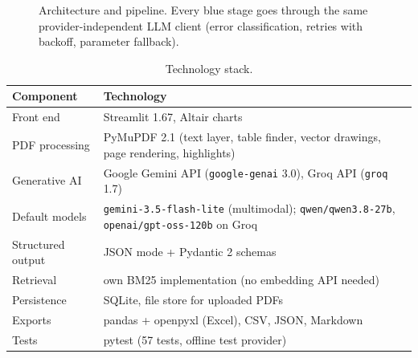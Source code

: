 \documentclass[11pt,a4paper]{article}
\newcommand{\code}[1]{\texttt{\small #1}}
\begin{document}
\begin{figure}[H]
\caption{Architecture and pipeline. Every blue stage goes through the same provider-independent LLM client
(error classification, retries with backoff, parameter fallback).}
\label{fig:arch}
\end{figure}

\begin{table}[H]
\centering\small
\begin{tabularx}{\linewidth}{@{}lX@{}}
\toprule
\textbf{Component} & \textbf{Technology}\\\midrule
Front end & Streamlit 1.67, Altair charts\\
PDF processing & PyMuPDF 2.1 (text layer, table finder, vector drawings, page rendering, highlights)\\
Generative AI & Google Gemini API (\code{google-genai} 3.0), Groq API (\code{groq} 1.7)\\
Default models & \code{gemini-3.5-flash-lite} (multimodal); \code{qwen/qwen3.8-27b}, \code{openai/gpt-oss-120b} on Groq\\
Structured output & JSON mode + Pydantic 2 schemas\\
Retrieval & own BM25 implementation (no embedding API needed)\\
Persistence & SQLite, file store for uploaded PDFs\\
Exports & pandas + openpyxl (Excel), CSV, JSON, Markdown\\
Tests & pytest (57 tests, offline test provider)\\
\bottomrule
\end{tabularx}
\caption{Technology stack.}
\end{table}
\end{document}
